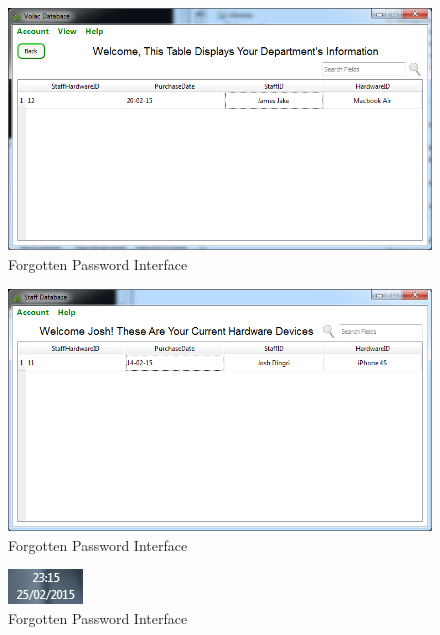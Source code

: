 \begin{figure}[H]
    \includegraphics[width=\textwidth]{./Testing/Images/ManagerNoChange.png}
    \caption{Forgotten Password Interface} \label{fig:ManagerNoChange}
\end{figure}

\begin{figure}[H]
    \includegraphics[width=\textwidth]{./Testing/Images/StaffNoChange.png}
    \caption{Forgotten Password Interface} \label{fig:StaffNoChange}
\end{figure}

\begin{figure}[H]
    \includegraphics[width=\textwidth]{./Testing/Images/CurrentDate.png}
    \caption{Forgotten Password Interface} \label{fig:CurrentDate}
\end{figure}

